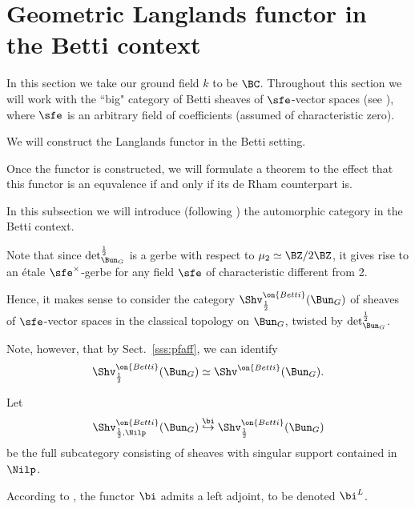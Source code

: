 \documentclass[9pt]{amsart}
\theoremstyle{remark}
\theoremstyle{definition}
\theoremstyle{remark}
\newcommand{\secref}[1]{Sect.~\ref{#1}}
\numberwithin{equation}{section}
\begin{document}
\section{Geometric Langlands functor in the Betti context} \label{s:Betti}

In this section we take our ground field $k$ to be $\BC$. Throughout this section we will  work with the ``big" category of Betti 
sheaves of $\sfe$-vector spaces (see \cite[Appendix G]{AGKRRV}), where $\sfe$ is an arbitrary field of coefficients 
(assumed of characteristic zero). 

\medskip

We will construct the Langlands functor in the Betti setting. 

\medskip

Once the functor is constructed, we will formulate a theorem to the effect that this functor is an equvalence
if and only if its de Rham counterpart is. 


In this subsection we will introduce (following \cite{BZN}) the automorphic category in the Betti context. 

\sssec{}

Note that since $\det^{\frac{1}{2}}_{\Bun_G}$ is a gerbe with respect to $\mu_2\simeq \BZ/2\BZ$, it gives rise to an \'etale $\sfe^\times$-gerbe
for any field $\sfe$ of characteristic different from 2.

\medskip

Hence, it makes sense to consider the category $\Shv^{\on{Betti}}_{\frac{1}{2}}(\Bun_G)$ of sheaves of $\sfe$-vector spaces in the classical
topology on $\Bun_G$, twisted by $\det^{\frac{1}{2}}_{\Bun_G}$.

\medskip

Note, however, that by \secref{sss:pfaff}, we can identify 
$$\Shv^{\on{Betti}}_{\frac{1}{2}}(\Bun_G)\simeq \Shv^{\on{Betti}}(\Bun_G).$$

\sssec{}

Let 
$$\Shv^{\on{Betti}}_{\frac{1}{2},\Nilp}(\Bun_G) \overset{\bi}\hookrightarrow \Shv^{\on{Betti}}_{\frac{1}{2}}(\Bun_G)$$
be the full subcategory consisting of sheaves with singular support contained in $\Nilp$.

\medskip

According to \cite[Sect. 18.2.6]{AGKRRV}, the functor $\bi$ admits a left adjoint, to be denoted $\bi^L$. 

\sssec{} \label{sss:betti comp gen}
\end{document}
